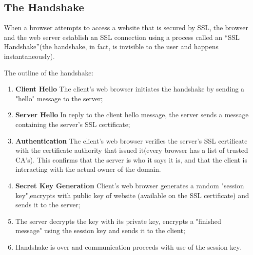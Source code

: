 \subsection{The Handshake} \cite{digicert} \cite{cloudflare}

When a browser attempts to access a website that is secured by SSL, the browser and the web server establish an SSL connection using a process called an “SSL Handshake”(the handshake, in fact, is invisible to the user and happens instantaneously).

The outline of the handshake:
\begin{enumerate}
\item \textbf{Client Hello} The client's web browser initiates the handshake by sending a "hello" message to the server;
\item \textbf{Server Hello} In reply to the client hello message, the server sends a message containing the server's SSL certificate;
\item \textbf{Authentication} The client's web browser verifies the server's SSL certificate with the certificate authority that issued it(every browser has a list of trusted CA's). This confirms that the server is who it says it is, and that the client is interacting with the actual owner of the domain.
\item \textbf{Secret Key Generation} Client's web browser generates a random "session key",encrypts with public key of website (available on the SSL certificate) and sends it to the server;
\item The server decrypts the key with its private key, encrypts a "finished message" using the session key and sends it to the client;
\item Handshake is over and communication proceeds with use of the session key.
\end{enumerate}

